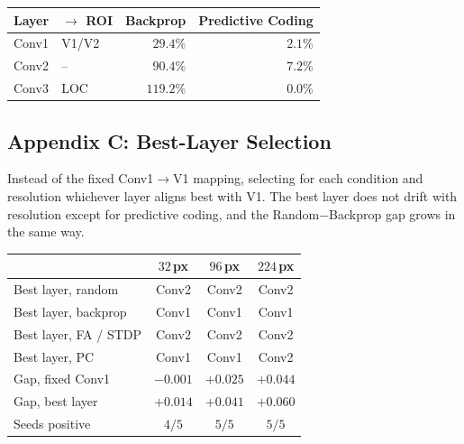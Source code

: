 \documentclass[10pt,twocolumn]{article}
\makeatletter
\providecommand{\DIFaddtex}[1]{{\protect\color{blue}\uwave{#1}}} %
\providecommand{\DIFdeltex}[1]{{\protect\color{red}\sout{#1}}} %
\providecommand{\DIFaddbegin}{} %
\providecommand{\DIFaddend}{} %
\providecommand{\DIFdelbegin}{} %
\providecommand{\DIFdelend}{} %
\providecommand{\DIFadd}[1]{\texorpdfstring{\DIFaddtex{#1}}{#1}} %
\providecommand{\DIFdel}[1]{\texorpdfstring{\DIFdeltex{#1}}{}} %
\providecommand{\DIFscaledelfig}{0.5}
\newlength{\DIFdelgraphicswidth} %
\newlength{\DIFdelgraphicsheight} %
\providecommand{\DIFaddincludegraphics}[2][]{{\color{blue}\fbox{\DIFOincludegraphics[#1]{#2}}}} %
\providecommand{\DIFdelincludegraphics}[2][]{%
\sbox{\DIFdelgraphicsbox}{\DIFOincludegraphics[#1]{#2}}%
\settoboxwidth{\DIFdelgraphicswidth}{\DIFdelgraphicsbox} %
\settoboxtotalheight{\DIFdelgraphicsheight}{\DIFdelgraphicsbox} %
\scalebox{\DIFscaledelfig}{%
\parbox[b]{\DIFdelgraphicswidth}{\usebox{\DIFdelgraphicsbox}\\[-\baselineskip] \rule{\DIFdelgraphicswidth}{0em}}\llap{\resizebox{\DIFdelgraphicswidth}{\DIFdelgraphicsheight}{%
\setlength{\unitlength}{\DIFdelgraphicswidth}%
\begin{picture}(1,1)%
\thicklines\linethickness{2pt} %
{\color[rgb]{1,0,0}\put(0,0){\framebox(1,1){}}}%
{\color[rgb]{1,0,0}\put(0,0){\line( 1,1){1}}}%
{\color[rgb]{1,0,0}\put(0,1){\line(1,-1){1}}}%
\end{picture}%
}\hspace*{3pt}}} %
} %
\DeclareRobustCommand{\DIFaddbegin}{\DIFOaddbegin \let\includegraphics\DIFaddincludegraphics} %
\DeclareRobustCommand{\DIFaddend}{\DIFOaddend \let\includegraphics\DIFOincludegraphics} %
\DeclareRobustCommand{\DIFdelbegin}{\DIFOdelbegin \let\includegraphics\DIFdelincludegraphics} %
\DeclareRobustCommand{\DIFdelend}{\DIFOaddend \let\includegraphics\DIFOincludegraphics} %
\let\sout@orig\sout %
\renewcommand{\sout}[1]{\ifmmode\text{\sout@orig{\ensuremath{#1}}}\else\sout@orig{#1}\fi} %
\makeatother
\begin{document}
\begingroup
\footnotesize
\begin{tabular}{@{}llrr@{}}
\toprule
Layer & $\to$ ROI & Backprop & Predictive Coding \\
\midrule
Conv1 & V1/V2 & $29.4\%$ & $2.1\%$ \\
Conv2 & --    & $90.4\%$ & $7.2\%$ \\
Conv3 & LOC   & $119.2\%$ & $0.0\%$ \\
\bottomrule
\end{tabular}
\endgroup

\subsection*{Appendix C: Best-Layer Selection}

\noindent Instead of the fixed Conv1$\to$V1 mapping, selecting for each condition and resolution whichever layer aligns best with V1. The best layer does not drift with resolution except for predictive coding, and the Random$-$Backprop gap grows in the same way.

\begingroup
\footnotesize
\begin{tabular}{@{}lccc@{}}
\toprule
 & $32$\,px & $96$\,px & $224$\,px \\
\midrule
Best layer, random & Conv2 & Conv2 & Conv2 \\
Best layer, backprop & Conv1 & Conv1 & Conv1 \\
Best layer, FA / STDP & Conv2 & Conv2 & Conv2 \\
Best layer, PC & Conv1 & Conv1 & Conv2 \\
\midrule
Gap, fixed Conv1 & \DIFdelbegin \DIFdel{$-0.001$ }\DIFdelend \DIFaddbegin \DIFadd{$\NV{gap.V1.32}$ }\DIFaddend & \DIFdelbegin \DIFdel{$+0.025$ }\DIFdelend \DIFaddbegin \DIFadd{$\NV{gap.V1.96}$ }\DIFaddend & \DIFdelbegin \DIFdel{$+0.044$ }\DIFdelend \DIFaddbegin \DIFadd{$\NV{gap.V1.224}$ }\DIFaddend \\
Gap, best layer & \DIFdelbegin \DIFdel{$+0.014$ }\DIFdelend \DIFaddbegin \DIFadd{$\NV{bestgap.32}$ }\DIFaddend & \DIFdelbegin \DIFdel{$+0.041$ }\DIFdelend \DIFaddbegin \DIFadd{$\NV{bestgap.96}$ }\DIFaddend & \DIFdelbegin \DIFdel{$+0.060$ }\DIFdelend \DIFaddbegin \DIFadd{$\NV{bestgap.224}$ }\DIFaddend \\
Seeds positive \DIFaddbegin \DIFadd{(best layer) }\DIFaddend & \DIFdelbegin \DIFdel{$4/5$ }\DIFdelend \DIFaddbegin \DIFadd{$\NV{bestgap.32.pos}/5$ }\DIFaddend & \DIFdelbegin \DIFdel{$5/5$ }\DIFdelend \DIFaddbegin \DIFadd{$\NV{bestgap.96.pos}/5$ }\DIFaddend & \DIFdelbegin \DIFdel{$5/5$ }\DIFdelend \DIFaddbegin \DIFadd{$\NV{bestgap.224.pos}/5$ }\DIFaddend \\
\bottomrule
\end{tabular}
\endgroup
\end{document}
